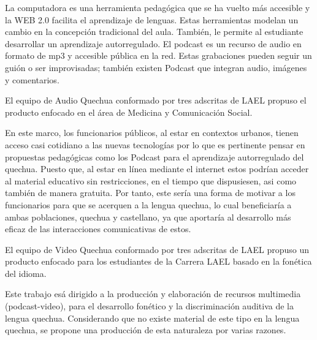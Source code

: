 La computadora es una herramienta pedag\'{o}gica que se ha vuelto m\'{a}s accesible y la WEB 2.0 facilita el aprendizaje de lenguas.
Estas herramientas modelan un cambio en la concepci\'{o}n tradicional del aula. Tambi\'{e}n, le permite al estudiante desarrollar
un aprendizaje autorregulado. El podcast es un recurso de audio en formato de mp3 y accesible p\'{u}blica en la red. Estas grabaciones
pueden seguir un gui\'{o}n o ser improvisadas; tambi\'{e}n existen Podcast que integran audio, im\'{a}genes y comentarios.\cite{AFSTVV2015}

El equipo de Audio Quechua conformado por tres adscritas de LAEL propuso el producto enfocado en el \'{a}rea de Medicina y
Comunicaci\'{o}n Social. 

En este marco, los funcionarios p\'{u}blicos, al estar en contextos urbanos, tienen acceso casi cotidiano a las nuevas tecnolog\'{i}as
por lo que es pertinente pensar en propuestas pedag\'{o}gicas como los Podcast para el aprendizaje autorregulado del quechua. Puesto que,
al estar en l\'{i}nea mediante el internet estos podr\'{i}an acceder al material educativo sin restricciones, en el tiempo que dispusiesen,
asi como tambi\'{e}n de manera gratuita. Por tanto, este ser\'{i}a una forma de motivar a los funcionarios para que se acerquen a la lengua
quechua, lo cual beneficiar\'{i}a a ambas poblaciones, quechua y castellano, ya que aportar\'{i}a al desarrollo m\'{a}s eficaz de las interacciones comunicativas de estos.\cite{CCZ2015}

El equipo de Video Quechua conformado por tres adscritas de LAEL propuso un producto enfocado para los estudiantes de la Carrera
LAEL basado en la fon\'{e}tica del idioma.

Este trabajo es\'{a} dirigido a la producci\'{o}n y elaboraci\'{o}n de recursos multimedia (podcast-video), para el desarrollo fon\'{e}tico y la discriminaci\'{o}n auditiva de la lengua quechua. Considerando que no existe material de este tipo en la lengua quechua, se propone una producci\'{o}n de esta naturaleza por varias razones.\cite{CGL2015}

